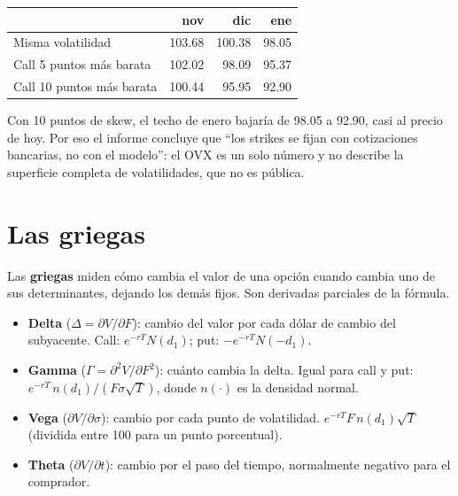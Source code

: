 \begin{informe}
\begin{center}\small
{}
\begin{tabular}{@{}lrrr@{}}
\toprule
& nov & dic & ene\\
\midrule
Misma volatilidad & 103.68 & 100.38 & 98.05\\
Call 5 puntos más barata & 102.02 & 98.09 & 95.37\\
Call 10 puntos más barata & 100.44 & 95.95 & 92.90\\
\bottomrule
\end{tabular}
\end{center}
Con 10 puntos de skew, el techo de enero bajaría de 98.05 a 92.90, casi al precio de hoy. Por eso el informe concluye que \enquote{los strikes se fijan con cotizaciones bancarias, no con el modelo}: el OVX es un solo número y no describe la superficie completa de volatilidades, que no es pública.
\end{informe}

\section{Las griegas}

Las \textbf{griegas} miden cómo cambia el valor de una opción cuando cambia uno de sus determinantes, dejando los demás fijos. Son derivadas parciales de la fórmula.

\begin{definicion}
\begin{itemize}
\item \textbf{Delta} ($\Delta=\partial V/\partial F$): cambio del valor por cada dólar de cambio del subyacente. Call: $e^{-rT}N(d_1)$; put: $-e^{-rT}N(-d_1)$.
\item \textbf{Gamma} ($\Gamma=\partial^2V/\partial F^2$): cuánto cambia la delta. Igual para call y put: $e^{-rT}\,n(d_1)/(F\sigma\sqrt T)$, donde $n(\cdot)$ es la densidad normal.
\item \textbf{Vega} ($\partial V/\partial\sigma$): cambio por cada punto de volatilidad. $e^{-rT}F\,n(d_1)\sqrt T$ (dividida entre 100 para un punto porcentual).
\item \textbf{Theta} ($\partial V/\partial t$): cambio por el paso del tiempo, normalmente negativo para el comprador.
\end{itemize}
\end{definicion}

